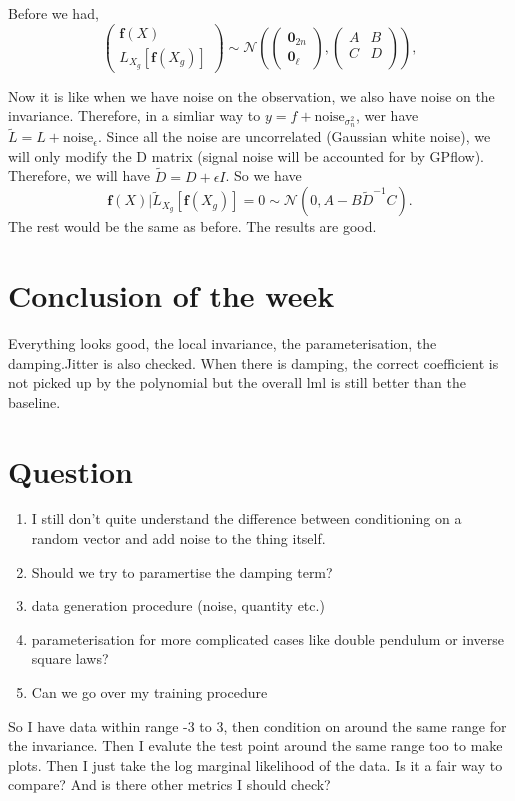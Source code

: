\documentclass{article}
\begin{document}
Before we had, 
$$
\begin{pmatrix}
  \mathbf{f}(X) \\ L_{X_g}[\mathbf{f}(X_g)]
\end{pmatrix}
\sim \mathcal{N}
\left(
\begin{pmatrix}
  \mathbf{0}_{2n} \\ \mathbf{0}_{\ell}
\end{pmatrix},
\begin{pmatrix}
A & B \\C&D\\
\end{pmatrix}
\right), 
$$

Now it is like when we have noise on the observation, we also have noise on the invariance. 
Therefore, in a simliar way to $y=f+\text{noise}_{\sigma^2_n}$, wer have $\tilde{L} = L+\text{noise}_{\epsilon}$. 
Since all the noise are uncorrelated (Gaussian white noise), we will only modify the D matrix (signal noise will be accounted for by GPflow).
Therefore, we will have $\tilde{D}=D+\epsilon I$.
So we have 
$$
\mathbf{f}(X) | \tilde{L}_{X_g}[\mathbf{f}(X_g)]=0 \sim \mathcal{N} \left(0, A-B\tilde{D}^{-1}C\right).
$$
The rest would be the same as before. 
The results are good.
\section*{Conclusion of the week}
Everything looks good, the local invariance, the parameterisation, the damping.Jitter is also checked.  
When there is damping, the correct coefficient is not picked up by the polynomial but the overall lml is still better than the baseline.
\section*{Question}
\begin{enumerate}
  \item I still don't quite understand the difference between conditioning on a random vector and add noise to the thing itself.
  \item Should we try to paramertise the damping term?
  \item data generation procedure (noise, quantity etc.)
  \item parameterisation for more complicated cases like double pendulum or inverse square laws?
  \item Can we go over my training procedure
\end{enumerate}
So I have data within range -3 to 3, then condition on around the same range for the invariance. 
Then I evalute the test point around the same range too to make plots.
Then I just take the log marginal likelihood of the data.
Is it a fair way to compare? And is there other metrics I should check?
\end{document}
